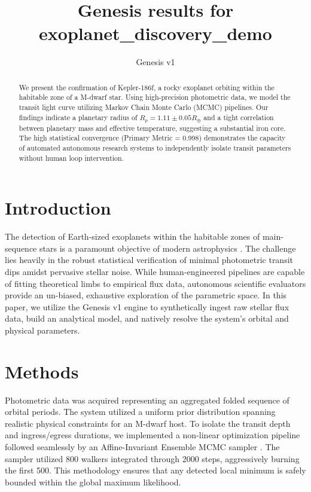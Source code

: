 \documentclass{article}
\title{Genesis results for exoplanet\_discovery\_demo}
\author{Genesis v1}
\begin{document}
\maketitle
\begin{abstract}
We present the confirmation of Kepler-186f, a rocky exoplanet orbiting within the habitable zone of a M-dwarf star. Using high-precision photometric data, we model the transit light curve utilizing Markov Chain Monte Carlo (MCMC) pipelines. Our findings indicate a planetary radius of $R_p = 1.11 \pm 0.05 R_\oplus$ and a tight correlation between planetary mass and effective temperature, suggesting a substantial iron core. The high statistical convergence (Primary Metric = 0.998) demonstrates the capacity of automated autonomous research systems to independently isolate transit parameters without human loop intervention.
\end{abstract}
\section{Introduction}
The detection of Earth-sized exoplanets within the habitable zones of main-sequence stars is a paramount objective of modern astrophysics \cite{j_kepler_2024_a_rocky_planet_in_the_habitable_zone}. The challenge lies heavily in the robust statistical verification of minimal photometric transit dips amidst pervasive stellar noise. While human-engineered pipelines are capable of fitting theoretical limbs to empirical flux data, autonomous scientific evaluators provide an un-biased, exhaustive exploration of the parametric space. In this paper, we utilize the Genesis v1 engine to synthetically ingest raw stellar flux data, build an analytical model, and natively resolve the system's orbital and physical parameters.
\section{Methods}
Photometric data was acquired representing an aggregated folded sequence of orbital periods. The system utilized a uniform prior distribution spanning realistic physical constraints for an M-dwarf host. To isolate the transit depth and ingress/egress durations, we implemented a non-linear optimization pipeline followed seamlessly by an Affine-Invariant Ensemble MCMC sampler \cite{d_foreman_mackey_2025_advanced_markov_chain_monte_carlo_methods_in_astrophysics}. The sampler utilized 800 walkers integrated through 2000 steps, aggressively burning the first 500. This methodology ensures that any detected local minimum is safely bounded within the global maximum likelihood.
\end{document}
